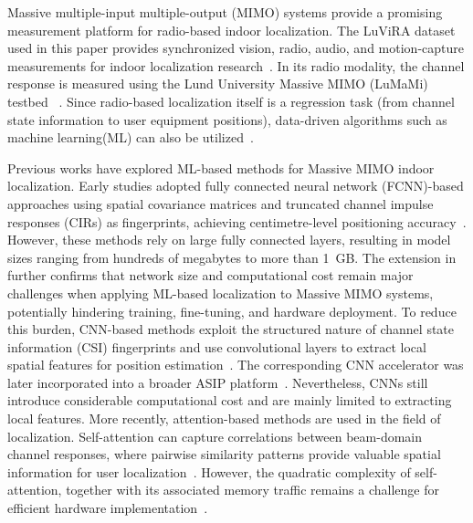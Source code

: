 \documentclass[lettersize,journal]{IEEEtran}
\begin{document}
Massive multiple-input multiple-output (MIMO) systems provide a promising
measurement platform for radio-based indoor localization. The LuViRA dataset used in this paper provides synchronized vision, radio, audio, and motion-capture measurements for indoor localization research~\cite{LuViRA2024,LuViRAValidation2024}. In its radio modality, the channel response is measured using the Lund University Massive MIMO (LuMaMi) testbed
~\cite{LuMaMi2017}. Since radio-based localization itself is a regression task (from channel state information to user equipment positions), data-driven algorithms such as machine learning(ML) can also be utilized~\cite{TianICC2023}.

Previous works have explored ML-based methods for Massive MIMO indoor localization. 
Early studies adopted fully connected neural network (FCNN)-based approaches using spatial covariance matrices and truncated channel impulse responses (CIRs) as fingerprints, achieving centimetre-level positioning accuracy~\cite{TianICC2023}. However, these methods rely on large fully connected layers, resulting in model sizes ranging from hundreds of megabytes to more than 1~GB. The extension in~\cite{Tian2024} further confirms that network size and computational cost remain major challenges when applying ML-based localization to Massive MIMO systems, potentially hindering training, fine-tuning, and hardware deployment. To reduce this burden, CNN-based methods exploit the structured nature of channel state information (CSI) fingerprints and use convolutional layers to extract local spatial features for position estimation~\cite{AttariISCAS2021}. The corresponding CNN accelerator was later incorporated into a broader ASIP platform~\cite{AttariASIP2025}. Nevertheless, CNNs still introduce considerable computational cost and are mainly limited to extracting local features. More recently, attention-based methods are used in the field of localization. Self-attention can capture correlations between beam-domain 
channel responses, where pairwise similarity patterns provide valuable spatial information for 
user localization~\cite{Tian2024Attention}. However, the quadratic complexity of self-attention, together with its associated memory traffic remains a challenge for efficient hardware implementation~\cite{YamanTransformer2026}.
\end{document}
